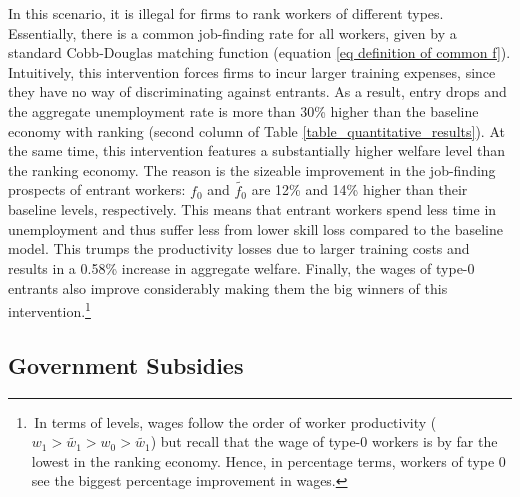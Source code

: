 \documentclass[12pt]{article} %
\theoremstyle{definition}
\begin{document}
In this scenario, it is illegal for firms to rank workers of different types.
Essentially, there is a common job-finding rate for all workers, given by a standard Cobb-Douglas matching function (equation \ref{eq definition of common f}).
Intuitively, this intervention forces firms to incur larger training expenses, since they have no way of discriminating against entrants. 
As a result, entry drops and the aggregate unemployment rate is more than 30\% higher than the baseline economy with ranking (second column of Table \ref{table_quantitative_results}).
At the same time, this intervention features a substantially higher welfare level than the ranking economy. 
The reason is the sizeable improvement in the job-finding prospects of entrant workers: $f_{0}$ and $\tilde{f_{0}}$ are 12\% and 14\% higher than their baseline levels, respectively.
This means that entrant workers spend less time in unemployment and thus suffer less from lower skill loss compared to the baseline model.
This trumps the productivity losses due to larger training costs and results in a 0.58\% increase in aggregate welfare.
Finally, the wages of type-0 entrants also improve considerably making them the big winners of this intervention.\footnote{\,In terms of levels, wages follow the order of worker productivity ($w_{1} > \tilde{w_{1}} > w_{0} > \tilde{w_{1}}$) but recall that the wage of type-0 workers is by far the lowest in the ranking economy. Hence, in percentage terms, workers of type 0 see the biggest percentage improvement in wages.}


\subsection{Government Subsidies} \label{section government subsidies quant}
\end{document}
